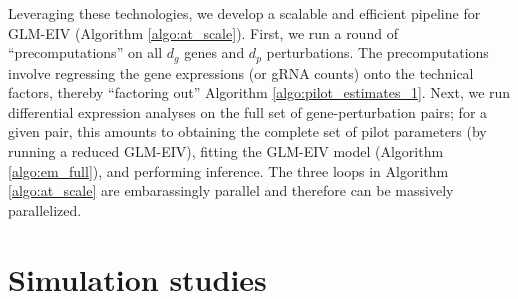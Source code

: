 \documentclass[12pt]{article}
\begin{document}
Leveraging these technologies, we develop a scalable and efficient pipeline for GLM-EIV (Algorithm \ref{algo:at_scale}). First, we run a round of ``precomputations'' on all $d_g$ genes and $d_p$ perturbations. The precomputations involve regressing the gene expressions (or gRNA counts) onto the technical factors, thereby ``factoring out'' Algorithm \ref{algo:pilot_estimates_1}. Next, we run differential expression analyses on the full set of gene-perturbation pairs; for a given pair, this amounts to obtaining the complete set of pilot parameters (by running a reduced GLM-EIV), fitting the GLM-EIV model (Algorithm \ref{algo:em_full}), and performing inference. The three loops in Algorithm \ref{algo:at_scale} are embarassingly parallel and therefore can be massively parallelized. 


\section{Simulation studies}\label{sec:simulation}
\end{document}
